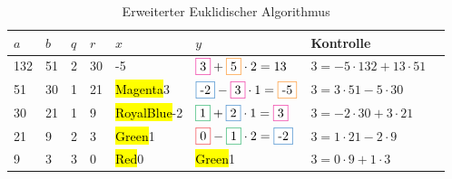 \begin{table}[h]
  \caption{Erweiterter Euklidischer Algorithmus}
  \centering
  \begin{tabular}{|l|l|l|l|l|l|l|l|}
    \hline
    $a$ & $b$ & $q$ & $r$ & $x$                & $y$                                                              & Kontrolle                        \\ \hline
    132 & 51  & 2   & 30  & -5                 & $\hl{Magenta}{3} + \hl{orange}{5} \cdot 2 = 13$                  & $3 = -5 \cdot 132 + 13 \cdot 51$ \\ \hline
    51  & 30  & 1   & 21  & \hl{Magenta}{3}    & $\hl{RoyalBlue}{-2} - \hl{Magenta}{3} \cdot 1 = \hl{orange}{-5}$ & $3 = 3 \cdot 51 - 5 \cdot 30$    \\ \hline
    30  & 21  & 1   & 9   & \hl{RoyalBlue}{-2} & $\hl{Green}{1} + \hl{RoyalBlue}{2} \cdot 1 = \hl{Magenta}{3} $   & $3 = -2 \cdot 30 + 3 \cdot 21$   \\ \hline
    21  & 9   & 2   & 3   & \hl{Green}{1}      & $\hl{Red}{0} - \hl{Green}{1}  \cdot 2 = \hl{RoyalBlue}{-2}$      & $3 = 1 \cdot 21 - 2 \cdot 9$     \\ \hline
    9   & 3   & 3   & 0   & \hl{Red}{0}        & \hl{Green}{1}                                                    & $3 = 0 \cdot 9 + 1 \cdot 3$      \\ \hline
  \end{tabular}
\end{table}

